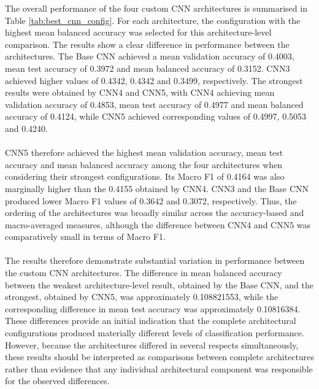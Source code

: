\documentclass[12pt, a4paper]{report}
\begin{document}
				The overall performance of the four custom CNN architectures is summarised in Table \ref{tab:best_cnn_config}. For each architecture, the configuration with the highest mean balanced accuracy was selected for this architecture-level comparison. The results show a clear difference in performance between the architectures. The Base CNN achieved a mean validation accuracy of 0.4003, mean test accuracy of 0.3972 and mean balanced accuracy of 0.3152. CNN3 achieved higher values of 0.4342, 0.4342 and 0.3499, respectively. The strongest results were obtained by CNN4 and CNN5, with CNN4 achieving mean validation accuracy of 0.4853, mean test accuracy of 0.4977 and mean balanced accuracy of 0.4124, while CNN5 achieved corresponding values of 0.4997, 0.5053 and 0.4240.\\\\
				CNN5 therefore achieved the highest mean validation accuracy, mean test accuracy and mean balanced accuracy among the four architectures when considering their strongest configurations. Its Macro F1 of 0.4164 was also marginally higher than the 0.4155 obtained by CNN4. CNN3 and the Base CNN produced lower Macro F1 values of 0.3642 and 0.3072, respectively. Thus, the ordering of the architectures was broadly similar across the accuracy-based and macro-averaged measures, although the difference between CNN4 and CNN5 was comparatively small in terms of Macro F1.\\\\
				The results therefore demonstrate substantial variation in performance between the custom CNN architectures. The difference in mean balanced accuracy between the weakest architecture-level result, obtained by the Base CNN, and the strongest, obtained by CNN5, was approximately \num[round-precision=4]{0.108821553}, while the corresponding difference in mean test accuracy was approximately \num[round-precision=4]{0.10816384}. These differences provide an initial indication that the complete architectural configurations produced materially different levels of classification performance. However, because the architectures differed in several respects simultaneously, these results should be interpreted as comparisons between complete architectures rather than evidence that any individual architectural component was responsible for the observed differences.\\
\end{document}
